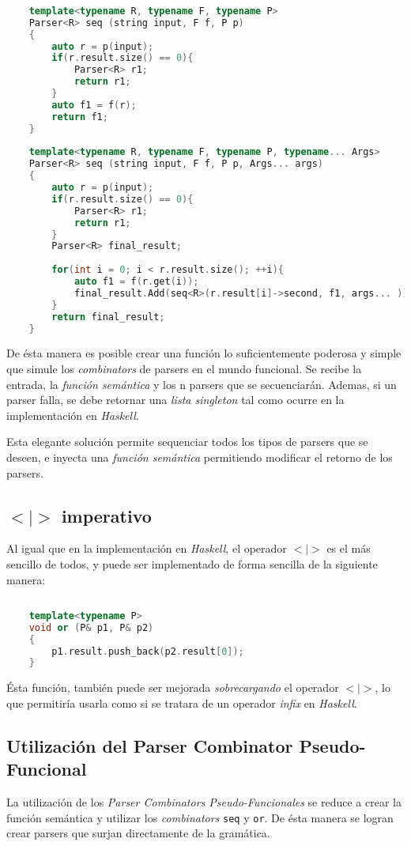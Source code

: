 	\begin{lstlisting}[language=C++, caption=función secuenciadora en C++]
	
	template<typename R, typename F, typename P>
	Parser<R> seq (string input, F f, P p)
	{
		auto r = p(input);
		if(r.result.size() == 0){
			Parser<R> r1;
			return r1;
		}		
		auto f1 = f(r);
		return f1;
	}
	
	template<typename R, typename F, typename P, typename... Args>
	Parser<R> seq (string input, F f, P p, Args... args)
	{
		auto r = p(input);
		if(r.result.size() == 0){
			Parser<R> r1;
			return r1;
		}
		Parser<R> final_result;
		
		for(int i = 0; i < r.result.size(); ++i){		
			auto f1 = f(r.get(i));
			final_result.Add(seq<R>(r.result[i]->second, f1, args... ));
		}		
		return final_result;
	}	
	\end{lstlisting}
	
	De ésta manera es posible crear una función lo suficientemente poderosa y simple que simule los \emph{combinators} de parsers en el mundo funcional. Se recibe la entrada, la \emph{función semántica} y los n parsers que se secuenciarán. Ademas, si un parser falla, se debe retornar una \emph{lista singleton} tal como ocurre en la implementación en \emph{Haskell}.
	
	Esta elegante solución permite sequenciar todos los tipos de parsers que se deseen, e inyecta una \emph{función semántica} permitiendo modificar el retorno de los parsers.
	
	\subsection{$<|>$ imperativo}
	Al igual que en la implementación en \emph{Haskell}, el operador $<|>$ es el más sencillo de todos, y puede ser implementado de forma sencilla de la siguiente manera:
	\begin{lstlisting}[language=C++, caption=función de elección en C++]
	
	template<typename P>
	void or (P& p1, P& p2)
	{
		p1.result.push_back(p2.result[0]);
	}	
	\end{lstlisting}
		
	Ésta función, también puede ser mejorada \emph{sobrecargando} el operador $<|>$, lo que permitiría usarla como si se tratara de un operador \emph{infix} en \emph{Haskell}.
	
	\subsection{Utilización del Parser Combinator Pseudo-Funcional}
	La utilización de los \emph{Parser Combinators Pseudo-Funcionales} se reduce a crear la función semántica y utilizar los \emph{combinators} \texttt{seq} y \texttt{or}. De ésta manera se logran crear parsers que surjan directamente de la gramática.
	
